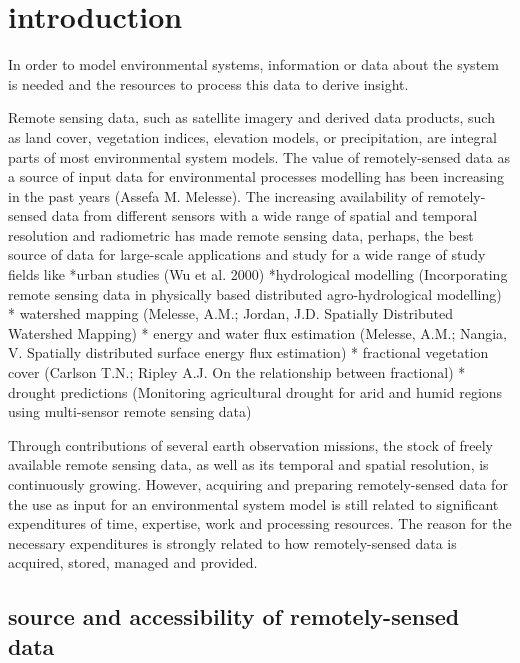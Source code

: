 \documentclass[11pt,twoside,a4paper,final]{report}
\begin{document}

\chapter{introduction}

In order to model environmental systems, information or data about the system is needed and the resources to process this data to derive insight.

Remote sensing data, such as satellite imagery and derived data products, such as land cover, vegetation indices, elevation models, or precipitation, are integral parts of most environmental system models. The value of remotely-sensed data as a source of input data for environmental processes modelling has been increasing in the past years (Assefa M. Melesse). The increasing availability of remotely-sensed data from different sensors with a wide range of spatial and temporal resolution and radiometric has made remote sensing data, perhaps, the best source of data for large-scale applications and study for a wide range of study fields like 
*urban studies (Wu et al. 2000)
*hydrological modelling (Incorporating remote sensing data in physically based distributed agro-hydrological modelling)
* watershed mapping (Melesse, A.M.; Jordan, J.D. Spatially Distributed Watershed Mapping)
* energy and water flux estimation (Melesse, A.M.; Nangia, V. Spatially distributed surface energy flux estimation)
* fractional vegetation cover (Carlson T.N.; Ripley A.J. On the relationship between fractional)
* drought predictions (Monitoring agricultural drought for arid and humid regions using multi-sensor remote sensing data)

Through contributions of several earth observation missions, the stock of freely available remote sensing data, as well as its temporal and spatial resolution, is continuously growing.
However, acquiring and preparing remotely-sensed data for the use as input for an environmental system model is still related to significant expenditures of time, expertise, work and processing resources. The reason for the necessary expenditures is strongly related to how remotely-sensed data is acquired, stored, managed and provided.

\section{source and accessibility of remotely-sensed data}
\end{document}

